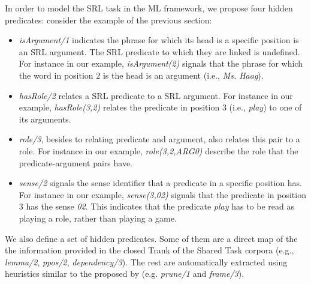 
In order to model the SRL task in the ML framework, we propose four hidden 
predicates: consider the example of the previous section:
\begin{itemize}
    \item \emph{isArgument/1} indicates the phrase for which its head is a 
        specific position is an SRL argument. The SRL predicate to which they 
        are linked is undefined.  For instance in our example,     
        \emph{isArgument(2)} signals that the phrase for which the word in 
        position $2$ is the head is an argument (i.e., \emph{Ms. Haag}).    
    \item \emph{hasRole/2} relates a SRL predicate to a SRL argument.  For instance in
        our example, \emph{hasRole(3,2)} relates the
        predicate in position $3$ (i.e., \emph{play}) to one of its arguments.
    \item \emph{role/3}, besides to relating predicate and argument, also
        relates this pair to a role. For instance in our example,
        \emph{role(3,2,ARG0)} describe the role that
        the predicate-argument pairs have.
    \item \emph{sense/2} signals the sense identifier that a predicate in a
        specific position has. For instance in our example, \emph{sense(3,02)}
        signals that the predicate in position $3$ has the sense \emph{02}.
        This indicates that the predicate \emph{play} has to be read as playing
        a role, rather than playing a game.
\end{itemize}
We also define a set of hidden predicates. Some of them are a direct map of the  
the information provided in the closed Trank of the Shared Task corpora (e.g., 
\emph{lemma/2}, \emph{ppos/2}, \emph{dependency/3}). The rest are automatically 
extracted using heuristics similar to the proposed by \citet{xue04calibrating} 
(e.g. \emph{prune/1} and \emph{frame/3}).


